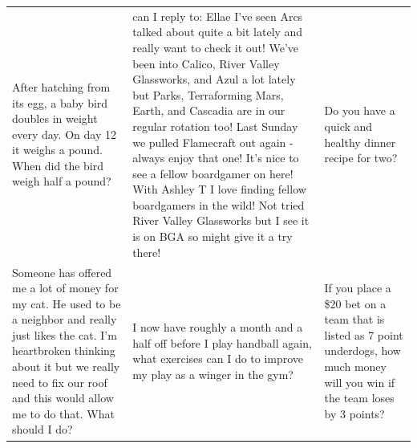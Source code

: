 \begin{table}[ht]
\begin{tabular}{p{4.3cm}p{4.3cm}p{4.3cm}}
After hatching from its egg, a baby bird doubles in weight every day. On day 12 it weighs a pound. When did the bird weigh half a pound? & can I reply to: Ellae I’ve seen Arcs talked about quite a bit lately and really want to check it out! We’ve been into Calico, River Valley Glassworks, and Azul a lot lately but Parks, Terraforming Mars, Earth, and Cascadia are in our regular rotation too!  Last Sunday we pulled Flamecraft out again - always enjoy that one! It’s nice to see a fellow boardgamer on here!   With  Ashley T I love finding fellow boardgamers in the wild!  Not tried River Valley Glassworks but I see it is on BGA so might give it a try there! & Do you have a quick and healthy dinner recipe for two? \\[4pt]
Someone has offered me a lot of money for my cat.  He used to be a neighbor and really just likes the cat.  I'm heartbroken thinking about it but we really need to fix our roof and this would allow me to do that. What should I do? & I now have roughly a month and a half off before I play handball again, what exercises can I do to improve my play as a winger in the gym? & If you place a \$20 bet on a team that is listed as 7 point underdogs, how much money will you win if the team loses by 3 points? \\[4pt]

\end{tabular}
\end{table}
